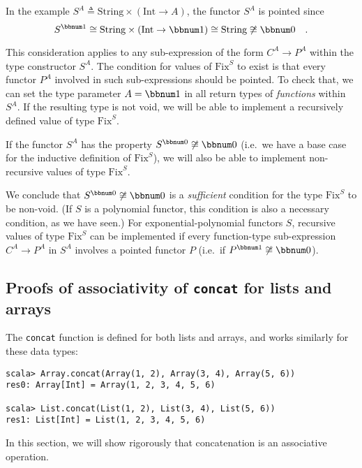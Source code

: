 In the example $S^{A}\triangleq\text{String}\times(\text{Int}\rightarrow A)$,
the functor $S^{A}$ is pointed since 
\[
S^{\bbnum 1}\cong\text{String}\times(\text{Int}\rightarrow\bbnum 1)\cong\text{String}\not\cong\bbnum 0\quad.
\]

This consideration applies to any sub-expression of the form $C^{A}\rightarrow P^{A}$
within the type constructor $S^{A}$. The condition for values of
$\text{Fix}^{S}$ to exist is that every functor $P^{A}$ involved
in such sub-expressions should be pointed. To check that, we can set
the type parameter $A=\bbnum 1$ in all return types of \emph{functions}
within $S^{A}$. If the resulting type is not void, we will be able
to implement a recursively defined value of type $\text{Fix}^{S}$.

If the functor $S^{A}$ has the property $S^{\bbnum 0}\not\cong\bbnum 0$
(i.e.~we have a base case for the inductive definition of $\text{Fix}^{S}$),
we will also be able to implement non-recursive values of type $\text{Fix}^{S}$.

We conclude that $S^{\bbnum 0}\not\cong\bbnum 0$ is a \emph{sufficient}
condition for the type $\text{Fix}^{S}$ to be non-void. (If $S$
is a polynomial functor, this condition is also a necessary condition,
as we have seen.) For exponential-polynomial functors $S$, recursive
values of type $\text{Fix}^{S}$ can be implemented if every function-type
sub-expression $C^{A}\rightarrow P^{A}$ in $S^{A}$ involves a pointed
functor $P$ (i.e.~if $P^{\bbnum 1}\not\cong\bbnum 0$).

\subsection{Proofs of associativity of \texttt{concat} for lists and arrays\label{subsec:Proofs-for-associativity-law-lists-and-arrays}}

The \lstinline!concat! function is defined for both lists and arrays,
and works similarly for these data types:
\begin{lstlisting}
scala> Array.concat(Array(1, 2), Array(3, 4), Array(5, 6))
res0: Array[Int] = Array(1, 2, 3, 4, 5, 6)

scala> List.concat(List(1, 2), List(3, 4), List(5, 6))
res1: List[Int] = List(1, 2, 3, 4, 5, 6)
\end{lstlisting}
In this section, we will show rigorously that concatenation is an
associative operation.

